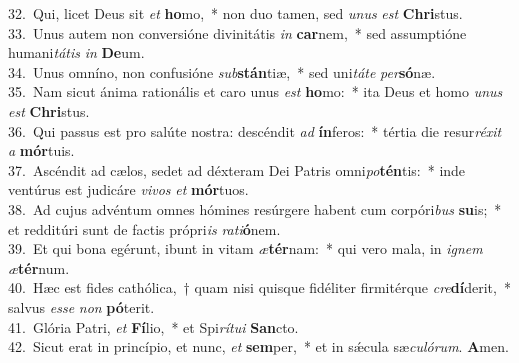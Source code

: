 {32.~}Qui, licet Deus sit \textit{et} \textbf{ho}mo,~* non duo tamen, sed \textit{u}\textit{nus} \textit{est} \textbf{Chri}stus.\\
{33.~}Unus autem non conversióne divinitátis \textit{in} \textbf{car}nem,~* sed assumptióne humani\textit{tá}\textit{tis} \textit{in} \textbf{De}um.\\
{34.~}Unus omníno, non confusióne \textit{sub}\textbf{stán}tiæ,~* sed uni\textit{tá}\textit{te} \textit{per}\textbf{só}næ.\\
{35.~}Nam sicut ánima rationális et caro unus \textit{est} \textbf{ho}mo:~* ita Deus et homo \textit{u}\textit{nus} \textit{est} \textbf{Chri}stus.\\
{36.~}Qui passus est pro salúte nostra: descéndit \textit{ad} \textbf{ín}feros:~* tértia die resur\textit{ré}\textit{xit} \textit{a} \textbf{mór}tuis.\\
{37.~}Ascéndit ad cælos, sedet ad déxteram Dei Patris omni\textit{po}\textbf{tén}tis:~* inde ventúrus est judicáre \textit{vi}\textit{vos} \textit{et} \textbf{mór}tuos.\\
{38.~}Ad cujus advéntum omnes hómines resúrgere habent cum corpóri\textit{bus} \textbf{su}is;~* et redditúri sunt de factis própri\textit{is} \textit{ra}\textit{ti}\textbf{ó}nem.\\
{39.~}Et qui bona egérunt, ibunt in vitam \textit{æ}\textbf{tér}nam:~* qui vero mala, in \textit{i}\textit{gnem} \textit{æ}\textbf{tér}num.\\
{40.~}Hæc est fides cathólica,~† quam nisi quisque fidéliter firmitérque \textit{cre}\textbf{dí}derit,~* salvus \textit{es}\textit{se} \textit{non} \textbf{pó}terit.\\
{41.~}Glória Patri, \textit{et} \textbf{Fí}lio,~* et Spi\textit{rí}\textit{tu}\textit{i} \textbf{San}cto.\\
{42.~}Sicut erat in princípio, et nunc, \textit{et} \textbf{sem}per,~* et in sǽcula sæ\textit{cu}\textit{ló}\textit{rum}. \textbf{A}men.\\
